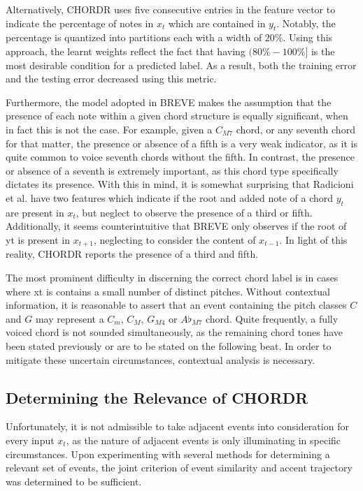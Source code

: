 \documentclass{article} %
\begin{document}
Alternatively, CHORDR uses five consecutive entries in the feature vector to indicate the percentage of notes in $x_t$ which are contained in $y_t$. Notably, the percentage is quantized into partitions each with a width of $20\%$. Using this approach, the learnt weights reflect the fact that having $(80\% - 100\%]$ is the most desirable condition for a predicted label. As a result, both the training error and the testing error decreased using this metric.

Furthermore, the model adopted in BREVE makes the assumption that the presence of each note within a given chord structure is equally significant, when in fact this is not the case. For example, given a $C_{M7}$ chord, or any seventh chord for that matter, the presence or absence of a fifth is a very weak indicator, as it is quite common to voice seventh chords without the fifth. In contrast, the presence or absence of a seventh is extremely important, as this chord type specifically dictates its presence. With this in mind, it is somewhat surprising that Radicioni et al. have two features which indicate if the root and added note of a chord $y_t$ are present in $x_t$, but neglect to observe the presence of a third or fifth. Additionally, it seems counterintuitive that BREVE only observes if the root of yt is present in $x_{t+1}$, neglecting to consider the content of $x_{t-1}$. In light of this reality, CHORDR reports the presence of a third and fifth.

The most prominent difficulty in discerning the correct chord label is in cases where xt is contains a small number of distinct pitches. Without contextual information, it is reasonable to assert that an event containing the pitch classes $C$ and $G$ may represent a $C_{m}$, $C_{M}$, $G_{M4}$ or $A\flat_{M7}$ chord. Quite frequently, a fully voiced chord is not sounded simultaneously, as the remaining chord tones have been stated previously or are to be stated on the following beat. In order to mitigate these uncertain circumstances, contextual analysis is necessary.

\subsection{Determining the Relevance of CHORDR}

Unfortunately, it is not admissible to take adjacent events into consideration for every input $x_t$, as the nature of adjacent events is only illuminating in specific circumstances. Upon experimenting with several methods for determining a relevant set of events, the joint criterion of event similarity and accent trajectory was determined to be sufficient.
\end{document}

